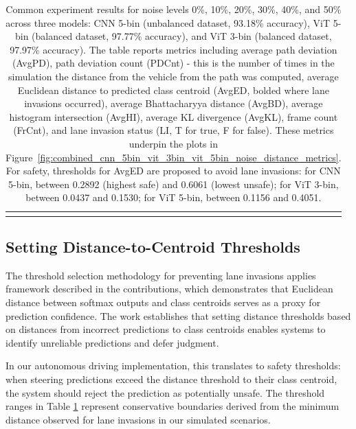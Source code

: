 \begin{longtable}{@{}cllrrrrrrrrrc@{}}
\bottomrule
\caption{Common experiment results for noise levels 0\%, 10\%, 20\%, 30\%, 40\%, and 50\% across three models: CNN 5-bin (unbalanced dataset, 93.18\% accuracy), ViT 5-bin (balanced dataset, 97.77\% accuracy), and ViT 3-bin (balanced dataset, 97.97\% accuracy). The table reports metrics including average path deviation (AvgPD), path deviation count (PDCnt) - this is the number of times in the simulation the distance from the vehicle from the path was computed, average Euclidean distance to predicted class centroid (AvgED, bolded where lane invasions occurred), average Bhattacharyya distance (AvgBD), average histogram intersection (AvgHI), average KL divergence (AvgKL), frame count (FrCnt), and lane invasion status (LI, T for true, F for false). These metrics underpin the plots in Figure~\ref{fig:combined_cnn_5bin_vit_3bin_vit_5bin_noise_distance_metrics}. For safety, thresholds for AvgED are proposed to avoid lane invasions: for CNN 5-bin, between 0.2892 (highest safe) and 0.6061 (lowest unsafe); for ViT 3-bin, between 0.0437 and 0.1530; for ViT 5-bin, between 0.1156 and 0.4051.}
\label{tab:experiment_stats_common_0_10_20_30_40_50}
\end{longtable}

\subsection{Setting Distance-to-Centroid Thresholds}

The threshold selection methodology for preventing lane invasions applies framework described in the contributions, which demonstrates that Euclidean distance between softmax outputs and class centroids serves as a proxy for prediction confidence. The work establishes that setting distance thresholds based on distances from incorrect predictions to class centroids enables systems to identify unreliable predictions and defer judgment.

In our autonomous driving implementation, this translates to safety thresholds: when steering predictions exceed the distance threshold to their class centroid, the system should reject the prediction as potentially unsafe. The threshold ranges in Table \ref{tab:experiment_stats_common_0_10_20_30_40_50} represent conservative boundaries derived from the minimum distance observed for lane invasions in our simulated scenarios. 

